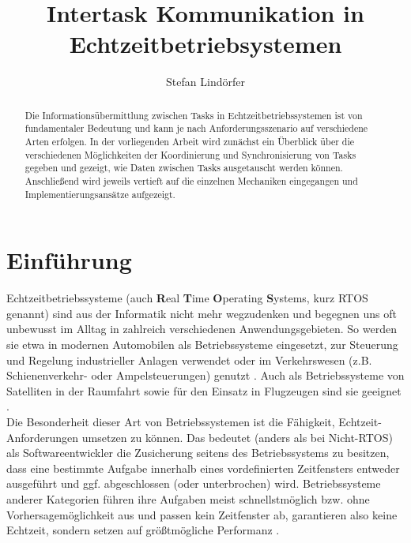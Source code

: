 \documentclass{llncs}
\begin{document}
\title{Intertask Kommunikation in Echtzeitbetriebsystemen}
\author{Stefan Lindörfer\\
}


\maketitle

\renewcommand{\abstractname}{Abstract}

\begin{abstract}
	Die Informationsübermittlung zwischen Tasks in Echtzeitbetriebssystemen ist von fundamentaler Bedeutung und kann je nach Anforderungsszenario auf verschiedene Arten erfolgen. In der vorliegenden Arbeit wird zunächst ein Überblick über die verschiedenen Möglichkeiten der Koordinierung und Synchronisierung von Tasks gegeben und gezeigt, wie Daten zwischen Tasks ausgetauscht werden können. Anschließend wird jeweils vertieft auf die einzelnen Mechaniken eingegangen und Implementierungsansätze aufgezeigt.
\end{abstract}

\section{Einführung}
\label{subsec:Einführung}
Echtzeitbetriebssysteme (auch \textbf{R}eal \textbf{T}ime \textbf{O}perating \textbf{S}ystems, kurz RTOS genannt) sind aus der Informatik nicht mehr wegzudenken und begegnen uns oft unbewusst im Alltag in zahlreich verschiedenen Anwendungsgebieten. So werden sie etwa in modernen Automobilen als Betriebssysteme eingesetzt, zur Steuerung und Regelung industrieller Anlagen verwendet oder im Verkehrswesen (z.B. Schienenverkehr- oder Ampelsteuerungen) genutzt \autocite[vgl.][157]{Winzker2008}. Auch als Betriebssysteme von Satelliten in der Raumfahrt sowie für den Einsatz in Flugzeugen sind sie geeignet \autocite{Wuerzburg2019}.\\

Die Besonderheit dieser Art von Betriebssystemen ist die Fähigkeit, Echtzeit-Anforderungen umsetzen zu können. Das bedeutet (anders als bei Nicht-RTOS) als Softwareentwickler die Zusicherung seitens des Betriebssystems zu besitzen, dass eine bestimmte Aufgabe innerhalb eines vordefinierten Zeitfensters entweder ausgeführt und ggf. abgeschlossen (oder unterbrochen) wird. Betriebssysteme anderer Kategorien führen ihre Aufgaben meist schnellstmöglich bzw. ohne Vorhersagemöglichkeit aus und passen kein Zeitfenster ab, garantieren also keine Echtzeit, sondern setzen auf größtmögliche Performanz \autocite[vgl.][317]{HeinzWoern2005}.\\
\end{document}
